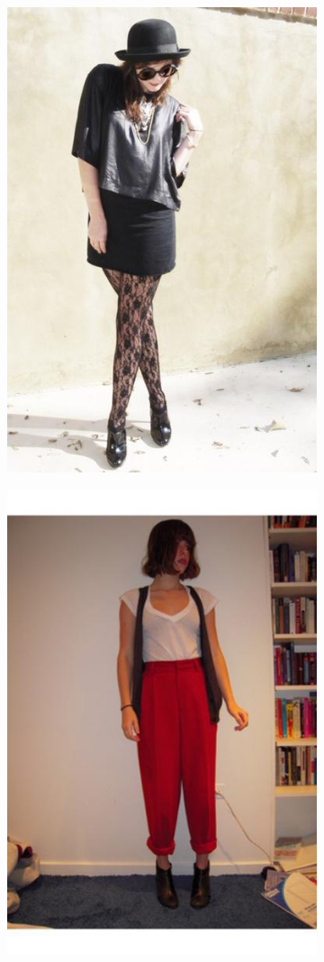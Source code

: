 \documentclass[12pt]{report}
\begin{document}
\begin{figure}
  \begin{subfigure}[b]{0.2\textwidth}
  \centering
    \includegraphics[scale=0.2]{images/paper3.jpg}
  \end{subfigure}
  \begin{subfigure}[b]{0.2\textwidth}
  \centering
    \includegraphics[scale=0.2]{images/paper4.jpg}

\end{subfigure}
\end{figure}
\end{document}
